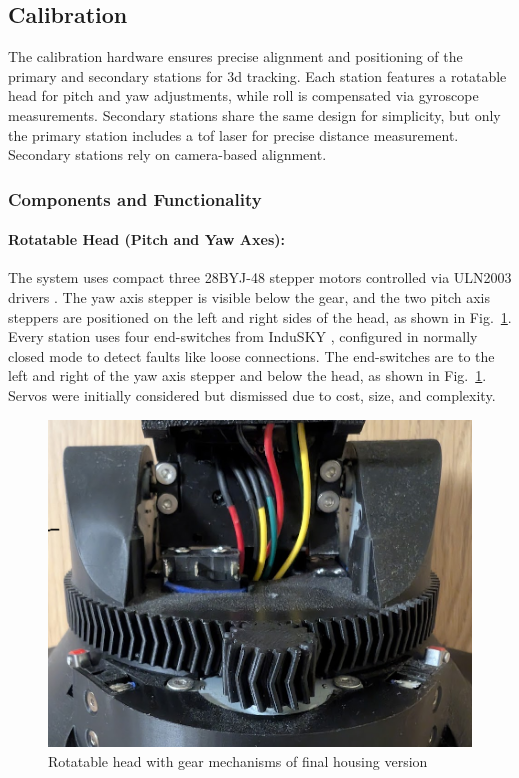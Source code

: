 \subsection{Calibration}

The calibration hardware ensures precise alignment and positioning of the primary and secondary stations for \acrshort{3d} tracking. Each station features a rotatable head for pitch and yaw adjustments, while roll is compensated via gyroscope measurements. Secondary stations share the same design for simplicity, but only the primary station includes a \acrshort{tof} laser for precise distance measurement. Secondary stations rely on camera-based alignment.

\subsubsection*{Components and Functionality}

\paragraph{Rotatable Head (Pitch and Yaw Axes):}
The system uses compact three 28BYJ-48 stepper motors controlled via ULN2003 drivers \cite{angeek_28byj_48}. The yaw axis stepper is visible below the gear, and the two pitch axis steppers are positioned on the left and right sides of the head, as shown in Fig.~\ref{fig:gearmechanisms}. Every station uses four end-switches from InduSKY \cite{indusky_microswitch}, configured in normally closed mode to detect faults like loose connections. The end-switches are to the left and right of the yaw axis stepper and below the head, as shown in Fig.~\ref{fig:gearmechanisms}. Servos \cite{miuzei_servos} were initially considered but dismissed due to cost, size, and complexity.

\begin{figure}[H]
	\centering
	\includegraphics[width=1.0\linewidth]{figures/gear_mechanisms}
	\caption{Rotatable head with gear mechanisms of final housing version}
	\label{fig:gearmechanisms}
\end{figure}

